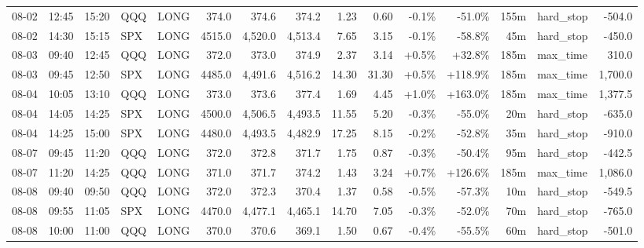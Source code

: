 \documentclass[11pt,a4paper,twoside]{article}
\begin{document}
\begin{landscape}
\begin{center}
\begin{longtable}{>{\color{txtmain}}l l l l l r r r r r r r r >{\color{txtmain}}l r}
08-02 & 12:45 & 15:20 & QQQ & LONG & 374.0 & 374.6 & 374.2 & 1.23 & 0.60 & \textcolor{lossred}{-0.1\%} & \textcolor{lossred}{-51.0\%} & 155m & hard\_stop & \textcolor{lossred}{-504.0} \\
08-02 & 14:30 & 15:15 & SPX & LONG & 4515.0 & 4,520.0 & 4,513.4 & 7.65 & 3.15 & \textcolor{lossred}{-0.1\%} & \textcolor{lossred}{-58.8\%} & 45m & hard\_stop & \textcolor{lossred}{-450.0} \\
08-03 & 09:40 & 12:45 & QQQ & LONG & 372.0 & 373.0 & 374.9 & 2.37 & 3.14 & \textcolor{wingreen}{+0.5\%} & \textcolor{wingreen}{+32.8\%} & 185m & max\_time & \textcolor{wingreen}{310.0} \\
08-03 & 09:45 & 12:50 & SPX & LONG & 4485.0 & 4,491.6 & 4,516.2 & 14.30 & 31.30 & \textcolor{wingreen}{+0.5\%} & \textcolor{wingreen}{+118.9\%} & 185m & max\_time & \textcolor{wingreen}{1,700.0} \\
08-04 & 10:05 & 13:10 & QQQ & LONG & 373.0 & 373.6 & 377.4 & 1.69 & 4.45 & \textcolor{wingreen}{+1.0\%} & \textcolor{wingreen}{+163.0\%} & 185m & max\_time & \textcolor{wingreen}{1,377.5} \\
08-04 & 14:05 & 14:25 & SPX & LONG & 4500.0 & 4,506.5 & 4,493.5 & 11.55 & 5.20 & \textcolor{lossred}{-0.3\%} & \textcolor{lossred}{-55.0\%} & 20m & hard\_stop & \textcolor{lossred}{-635.0} \\
08-04 & 14:25 & 15:00 & SPX & LONG & 4480.0 & 4,493.5 & 4,482.9 & 17.25 & 8.15 & \textcolor{lossred}{-0.2\%} & \textcolor{lossred}{-52.8\%} & 35m & hard\_stop & \textcolor{lossred}{-910.0} \\
08-07 & 09:45 & 11:20 & QQQ & LONG & 372.0 & 372.8 & 371.7 & 1.75 & 0.87 & \textcolor{lossred}{-0.3\%} & \textcolor{lossred}{-50.4\%} & 95m & hard\_stop & \textcolor{lossred}{-442.5} \\
08-07 & 11:20 & 14:25 & QQQ & LONG & 371.0 & 371.7 & 374.2 & 1.43 & 3.24 & \textcolor{wingreen}{+0.7\%} & \textcolor{wingreen}{+126.6\%} & 185m & max\_time & \textcolor{wingreen}{1,086.0} \\
08-08 & 09:40 & 09:50 & QQQ & LONG & 372.0 & 372.3 & 370.4 & 1.37 & 0.58 & \textcolor{lossred}{-0.5\%} & \textcolor{lossred}{-57.3\%} & 10m & hard\_stop & \textcolor{lossred}{-549.5} \\
08-08 & 09:55 & 11:05 & SPX & LONG & 4470.0 & 4,477.1 & 4,465.1 & 14.70 & 7.05 & \textcolor{lossred}{-0.3\%} & \textcolor{lossred}{-52.0\%} & 70m & hard\_stop & \textcolor{lossred}{-765.0} \\
08-08 & 10:00 & 11:00 & QQQ & LONG & 370.0 & 370.6 & 369.1 & 1.50 & 0.67 & \textcolor{lossred}{-0.4\%} & \textcolor{lossred}{-55.5\%} & 60m & hard\_stop & \textcolor{lossred}{-501.0} \\

\end{longtable}
\end{center}
\end{landscape}
\end{document}
